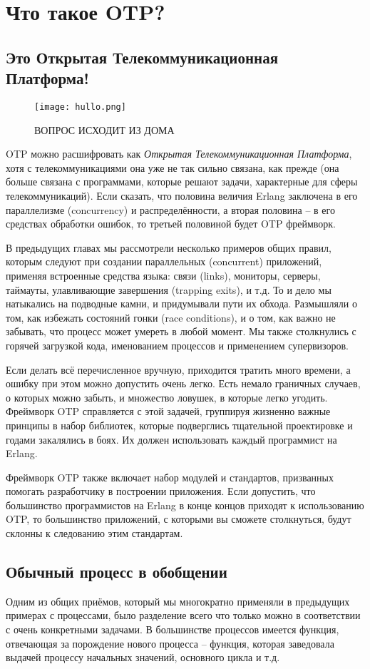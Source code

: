 \chapter{Что такое OTP?}
\label{what-is-otp}
\section{Это Открытая Телекоммуникационная Платформа!}
\label{its-the-open-telecom-platform}
\begin{wrapfigure}{l}{0.35\linewidth}
    \texttt{[image: hullo.png]}
    \caption{ВОПРОС ИСХОДИТ ИЗ ДОМА}
\end{wrapfigure}
OTP можно расшифровать как \emph{Открытая Телекоммуникационная Платформа}, хотя с телекоммуникациями она уже не так сильно связана, как прежде (она больше связана с программами, которые решают задачи, характерные для сферы телекоммуникаций).
Если сказать, что половина величия Erlang заключена в его параллелизме (concurrency) и распределённости, а вторая половина \--- в его средствах обработки ошибок, то третьей половиной будет OTP фреймворк.

В предыдущих главах мы рассмотрели несколько примеров общих правил, которым следуют при создании параллельных (concurrent) приложений, применяя встроенные средства языка: связи (links), мониторы, серверы, таймауты, улавливающие завершения (trapping exits), и т.д.
То и дело мы натыкались на подводные камни, и придумывали пути их обхода.
Размышляли о том, как избежать состояний гонки (race conditions), и о том, как важно не забывать, что процесс может умереть в любой момент.
Мы также столкнулись с горячей загрузкой кода, именованием процессов и применением супервизоров.

Если делать всё перечисленное вручную, приходится тратить много времени, а ошибку при этом можно допустить очень легко.
Есть немало граничных случаев, о которых можно забыть, и множество ловушек, в которые легко угодить.
Фреймворк OTP справляется с этой задачей, группируя жизненно важные принципы в набор библиотек, которые подверглись тщательной проектировке и годами закалялись в боях.
Их должен использовать каждый программист на Erlang.

Фреймворк OTP также включает набор модулей и стандартов, призванных помогать разработчику в построении приложения.
Если допустить, что большинство программистов на Erlang в конце концов приходят к использованию OTP, то большинство приложений, с которыми вы сможете столкнуться, будут склонны к следованию этим стандартам. 
\section{Обычный процесс в обобщении}
\label{the-common-process-abstracted}
Одним из общих приёмов, который мы многократно применяли в предыдущих примерах с процессами, было разделение всего что только можно в соответствии с очень конкретными задачами.
В большинстве процессов имеется функция, отвечающая за порождение нового процесса \--- функция, которая заведовала выдачей процессу начальных значений, основного цикла и т.д.

